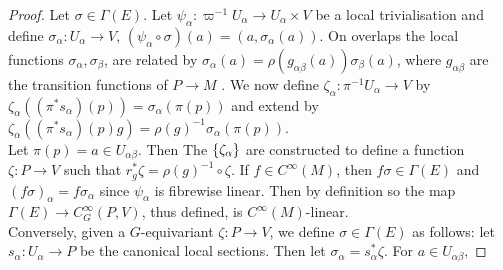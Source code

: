 \documentclass{article}
\begin{document}
\begin{proof}
	Let $\sigma \in \Gamma(E)$. Let $\psi_\alpha : \varpi^{-1} U_\alpha \to U_\alpha \times V$ be a local trivialisation and define $\sigma_\alpha : U_\alpha \to V, \, (\psi_\alpha \circ \sigma)(a) = (a,\sigma_\alpha(a))$. On overlaps the local functions $\sigma_\alpha, \sigma_\beta$, are related by $\sigma_\alpha(a) = \rho(g_{\alpha\beta}(a)) \sigma_\beta(a)$, where $g_{\alpha\beta}$ are the transition functions of $P \to M$ . We now define $\zeta_\alpha : \pi^{-1} U_\alpha \to V$ by $\zeta_\alpha((\pi^\ast s_\alpha)(p)) = \sigma_\alpha(\pi(p))$ and extend by $\zeta_\alpha((\pi^\ast s_\alpha)(p)g) = \rho(g)^{-1} \sigma_\alpha(\pi(p))$. \\
	Let $\pi(p) = a \in U_{\alpha\beta}$. Then 
	The $\left\{ \zeta_\alpha \right\}$ are constructed to define a function $\zeta:P \to V$ such that $r_g^\ast \zeta = \rho(g)^{-1} \circ \zeta$. If $f\in C^\infty(M)$, then $f\sigma \in \Gamma(E)$ and $(f\sigma)_\alpha = f\sigma_\alpha$ since $\psi_\alpha$ is fibrewise linear. Then by definition 
	so the map $\Gamma(E) \to C^\infty_G(P,V)$, thus defined, is $C^\infty(M)$-linear. \\
	Conversely, given a $G$-equivariant $\zeta:P \to V$, we define $\sigma\in \Gamma(E)$ as follows: let $s_\alpha : U_\alpha \to P$ be the canonical local sections. Then let $\sigma_\alpha = s_\alpha^\ast \zeta$. For $a \in U_{\alpha\beta}$, 
\end{proof}
\end{document}
